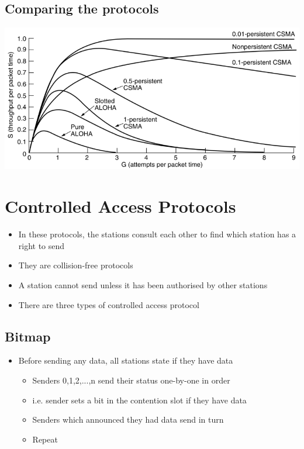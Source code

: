 \documentclass{article}[18pt]
\begin{document}
\subsection{Comparing the protocols}
\begin{center}
	\includegraphics[scale=0.7]{Compare-Protocols}
\end{center}

\section{Controlled Access Protocols}
\begin{itemize}
	\item In these protocols, the stations consult each other to find which station has a right to send
	\item They are collision-free protocols
	\item A station cannot send unless it has been authorised by other stations
	\item There are three types of controlled access protocol
\end{itemize}
\subsection{Bitmap}
\begin{itemize}
	\item Before sending any data, all stations state if they have data
	\begin{itemize}
		\item Senders 0,1,2,...,n send their status one-by-one in order
		\item i.e. sender sets a bit in the contention slot if they have data
		\item Senders which announced they had data send in turn
		\item Repeat
	\end{itemize}
\end{itemize}
\end{document}
